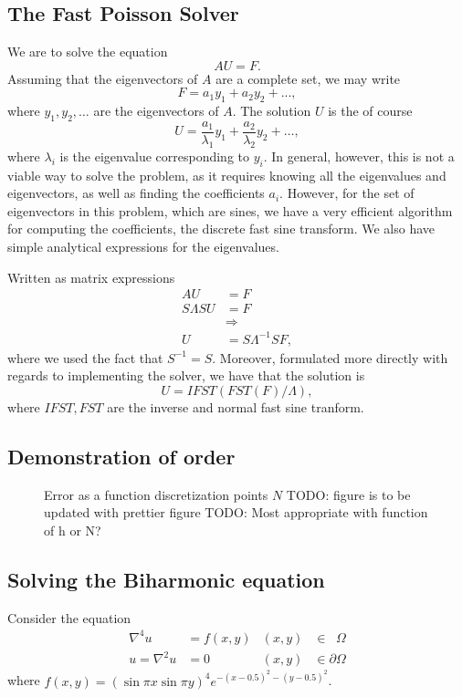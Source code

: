 \subsection{The Fast Poisson Solver}
We are to solve the equation
$$
A U = F.
$$
Assuming that the eigenvectors of $A$ are a complete set, we may write
$$
F = a_1 y_1 + a_2 y_2 + ...,
$$
where $y_1, y_2, \dots$ are the eigenvectors of $A$.
The solution $U$ is the of course
$$
U =
\frac{a_1}{\lambda_1} y_1
+ \frac{a_2}{\lambda_2} y_2
+ \dots,
$$
where $\lambda_i$ is the eigenvalue corresponding to $y_i$.
In general, however, this is not a viable way to solve the problem, as it requires knowing all the eigenvalues and eigenvectors, as well as finding the coefficients $a_i$.
However, for the set of eigenvectors in this problem, which are sines, we have a very efficient algorithm for computing the coefficients, the discrete fast sine transform.
We also have simple analytical expressions for the eigenvalues.

Written as matrix expressions
\begin{align}
  A U &= F\\
  S\Lambda S U &= F\\
  &\Rightarrow\\
  U &= S\Lambda^{-1} S F,
\end{align}
where we used the fact that $S^{-1} = S$.
Moreover, formulated more directly with regards to implementing the solver, we have that the solution is
$$
U = IFST(FST(F) / \Lambda),
$$
where $IFST, FST$ are the inverse and normal fast sine tranform.

\subsection{Demonstration of order}
\begin{figure}[h]
  \centering
  
  \caption{Error as a function discretization points $N$
    TODO: figure is to be updated with prettier figure
    TODO: Most appropriate with function of h or N?}
\end{figure}


\subsection{Solving the Biharmonic equation}
Consider the equation
\begin{align*}
  \nabla^4 u &= f(x, y) &(x, y) &\in \phantom{\partial}\Omega\\
  u = \nabla^2u &= 0  &(x, y) &\in \partial\Omega
\end{align*}
where $f(x, y) =
\left(
\sin \pi x
\sin \pi y
\right)^4
e^{-(x-0.5)^2 - (y-0.5)^2}
$.

